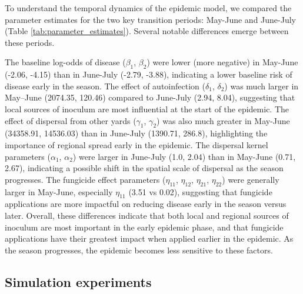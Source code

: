 \documentclass[10pt,a4paper]{article}
\begin{document}
To understand the temporal dynamics of the epidemic model, we compared the parameter estimates for the two key transition periods: May-June and June-July (Table \ref{tab:parameter_estimates}). Several notable differences emerge between these periods. 

The baseline log-odds of disease ($\beta_1$, $\beta_2$) were lower (more negative) in May-June (-2.06, -4.15) than in June-July (-2.79, -3.88), indicating a lower baseline risk of disease early in the season. The effect of autoinfection ($\delta_1$, $\delta_2$) was much larger in May--June (2074.35, 120.46) compared to June-July (2.94, 8.04), suggesting that local sources of inoculum are most influential at the start of the epidemic. The effect of dispersal from other yards ($\gamma_1$, $\gamma_2$) was also much greater in May-June (34358.91, 14536.03) than in June-July (1390.71, 286.8), highlighting the importance of regional spread early in the epidemic. The dispersal kernel parameters ($\alpha_1$, $\alpha_2$) were larger in June-July (1.0, 2.04) than in May-June (0.71, 2.67), indicating a possible shift in the spatial scale of dispersal  as the season progresses. The fungicide effect parameters ($\eta_{11}$, $\eta_{12}$, $\eta_{21}$, $\eta_{22}$) were generally larger in May-June, especially $\eta_{11}$ (3.51 vs 0.02), suggesting that fungicide applications are more impactful on reducing disease early in the season versus later. Overall, these differences indicate that both local and regional sources of inoculum are most important in the early epidemic phase, and that fungicide applications have their greatest impact when applied earlier in the epidemic. As the season progresses, the epidemic becomes less sensitive to these factors.

\subsection{Simulation experiments}
\end{document}
